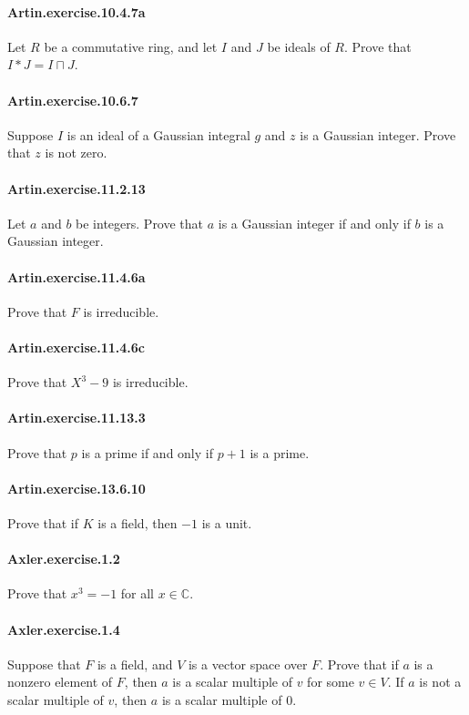 \documentclass{article}
\begin{document}
\paragraph{Artin.exercise.10.4.7a} Let $R$ be a commutative ring, and let $I$ and $J$ be ideals of $R$. Prove that $I * J = I ⊓ J$.

\paragraph{Artin.exercise.10.6.7} Suppose $I$ is an ideal of a Gaussian integral $g$ and $z$ is a Gaussian integer. Prove that $z$ is not zero.

\paragraph{Artin.exercise.11.2.13} Let $a$ and $b$ be integers. Prove that $a$ is a Gaussian integer if and only if $b$ is a Gaussian integer.

\paragraph{Artin.exercise.11.4.6a} Prove that $F$ is irreducible.

\paragraph{Artin.exercise.11.4.6c} Prove that $X^3 - 9$ is irreducible.

\paragraph{Artin.exercise.11.13.3} Prove that $p$ is a prime if and only if $p + 1$ is a prime.

\paragraph{Artin.exercise.13.6.10} Prove that if $K$ is a field, then $-1$ is a unit.

\paragraph{Axler.exercise.1.2} Prove that $x^3 = -1$ for all $x \in ℂ$.

\paragraph{Axler.exercise.1.4} Suppose that $F$ is a field, and $V$ is a vector space over $F$. Prove that if $a$ is a nonzero element of $F$, then $a$ is a scalar multiple of $v$ for some $v \in V$. If $a$ is not a scalar multiple of $v$, then $a$ is a scalar multiple of $0$.
\end{document}
